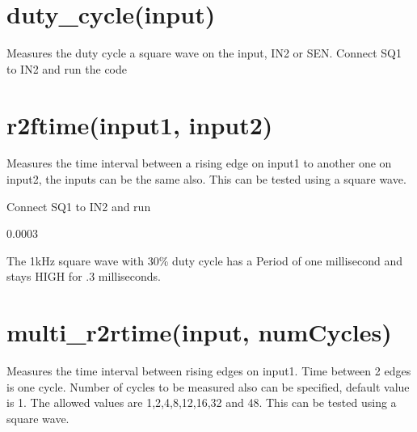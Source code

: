 \documentclass[a4paper,12pt,english]{sphinxmanual}
\begin{document}
\begin{sphinxVerbatim}[commandchars=\\\{\}]
 
\end{sphinxVerbatim}


\section{duty\_cycle(input)}
\label{\detokenize{9.0:duty-cycle-input}}
Measures the duty cycle a square wave on the input, IN2 or SEN. Connect
SQ1 to IN2 and run the code

\begin{sphinxVerbatim}[commandchars=\\\{\}]
 
 
\end{sphinxVerbatim}


\section{r2ftime(input1, input2)}
\label{\detokenize{9.0:r2ftime-input1-input2}}
Measures the time interval between a rising edge on input1 to another
one on input2, the inputs can be the same also. This can be tested using
a square wave.

Connect SQ1 to IN2 and run

\begin{sphinxVerbatim}[commandchars=\\\{\}]
 
  
\end{sphinxVerbatim}

0.0003

The 1kHz square wave with 30\% duty cycle has a Period of one millisecond
and stays HIGH for .3 milliseconds.


\section{multi\_r2rtime(input, numCycles)}
\label{\detokenize{9.0:multi-r2rtime-input-numcycles}}
Measures the time interval between rising edges on input1. Time between
2 edges is one cycle. Number of cycles to be measured also can be
specified, default value is 1. The allowed values are 1,2,4,8,12,16,32
and 48. This can be tested using a square wave.
\end{document}
